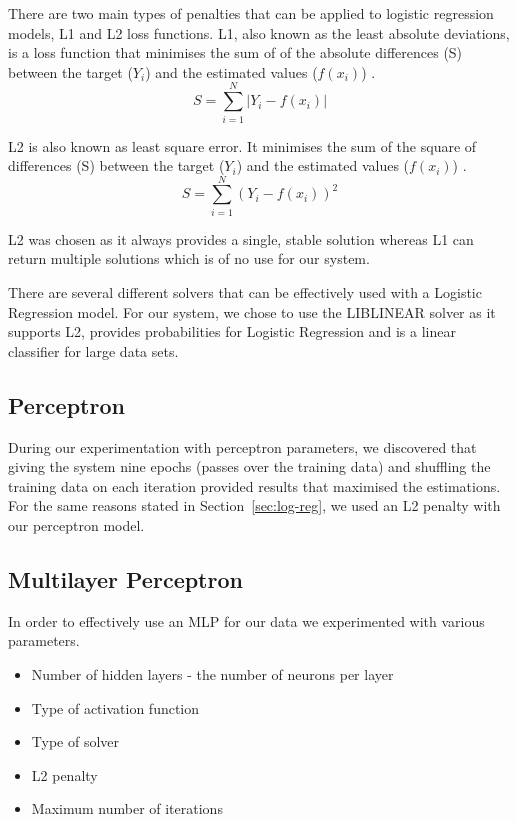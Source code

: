 \documentclass[bsc,frontabs,twoside,singlespacing,parskip,deptreport]{infthesis}     %
\begin{document}
 There are two main types of penalties that can be applied to logistic regression models, L1 and L2 loss functions.
 L1, also known as  the least absolute deviations, is a loss function that minimises the sum of of the absolute
 differences (S) between the target ($Y_i$) and the estimated values ($f(x_{i})$) \cite{l1l2}.
 \begin{equation}
   S = \sum_{i=1}^{N} | Y_i - f(x_i)|\nonumber
   \end{equation}
 
 L2 is also known as least square error. It minimises the sum of the square of differences (S) between
 the target ($Y_i$) and the estimated values ($f(x_{i})$) \cite{l1l2}.
 \begin{equation}
   S = \sum_{i=1}^{N} ( Y_i - f(x_i))^2\nonumber
   \end{equation}

 L2 was chosen as it always provides a single, stable solution whereas L1 can return multiple solutions
 which is of no use for our system.

 There are several different solvers that can be effectively used with a Logistic Regression model.
 For our system, we chose to use the LIBLINEAR solver as it supports L2, provides probabilities
 for Logistic Regression and is a linear classifier for large data sets\cite{fan2008liblinear}.
 
 \subsection{Perceptron}
 During our experimentation with perceptron parameters, we discovered that giving the system nine epochs (passes
 over the training data) and shuffling the training data on each iteration provided results that maximised the
 estimations. For the same reasons stated in Section~\ref{sec:log-reg}, we used an L2 penalty with our perceptron
 model.
 
 \subsection{Multilayer Perceptron}
 In order to effectively use an MLP for our data we experimented with various parameters.
 \begin{itemize}
 \item Number of hidden layers - the number of neurons per layer
 \item Type of activation function
 \item Type of solver
 \item L2 penalty
 \item Maximum number of iterations
 \end{itemize}
 
\end{document}
